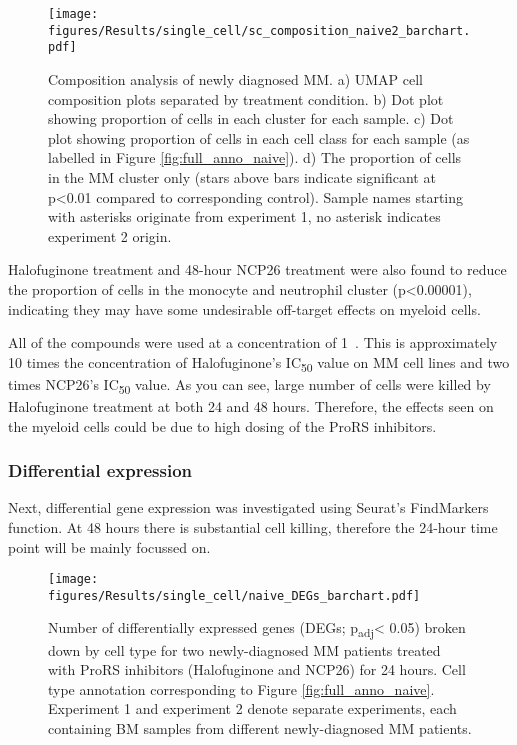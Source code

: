 \begin{figure}[htb]
\centering
\texttt{[image: figures/Results/single\_cell/sc\_composition\_naive2\_barchart.pdf]}
\caption[Composition analysis- newly diagnosed MM]{Composition analysis of newly diagnosed MM.
    a) UMAP cell composition plots separated by treatment condition.
    b) Dot plot showing proportion of cells in each cluster for each sample.
    c) Dot plot showing proportion of cells in each cell class for each sample (as labelled in Figure \ref{fig:full_anno_naive}).
    d) The proportion of cells in the MM cluster only (stars above bars indicate significant at p<0.01 compared to corresponding control).
    Sample names starting with asterisks originate from experiment 1, no asterisk indicates experiment 2 origin.}
\label{fig:composition_naive}
\end{figure}

Halofuginone treatment and 48-hour NCP26 treatment were also found to reduce the proportion of cells in the monocyte and neutrophil cluster (p<0.00001), indicating they may have some undesirable off-target effects on myeloid cells.

All of the compounds were used at a concentration of 1\si{\micro\Molar}.
This is approximately 10 times the concentration of Halofuginone's IC\textsubscript{50} value on MM cell lines and two times NCP26's IC\textsubscript{50} value.
As you can see, large number of cells were killed by Halofuginone treatment at both 24 and 48 hours.
Therefore, the effects seen on the myeloid cells could be due to high dosing of the ProRS inhibitors.

\subsubsection{Differential expression}
Next, differential gene expression was investigated using Seurat's FindMarkers function.
At 48 hours there is substantial cell killing, therefore the 24-hour time point will be mainly focussed on.
%
\begin{figure}[htb]
\centering
\texttt{[image: figures/Results/single\_cell/naive\_DEGs\_barchart.pdf]}
\caption[DEGs per cell type- newly-diagnosed MM]{Number of differentially expressed genes (DEGs; p\textsubscript{adj}< 0.05) broken down by cell type for two newly-diagnosed MM patients treated with ProRS inhibitors (Halofuginone and NCP26) for 24 hours.
Cell type annotation corresponding to Figure \ref{fig:full_anno_naive}.
Experiment 1 and experiment 2 denote separate experiments, each containing BM samples from different newly-diagnosed MM patients.}
\label{fig:naive_deg_bar}
\end{figure}

